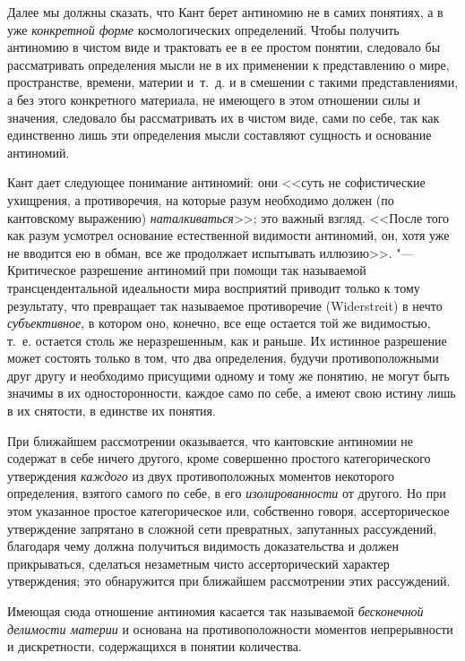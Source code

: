 Далее мы должны сказать, что Кант берет антиномию не в самих понятиях, а в
уже {\em конкретной форме} космологических определений.
Чтобы получить антиномию в чистом виде и трактовать ее в ее простом
понятии, следовало бы рассматривать определения мысли не в их применении к
представлению о мире, пространстве, времени, материи и~т.~д. и в смешении с
такими представлениями, а без этого конкретного материала, не имеющего в
этом отношении силы и значения, следовало бы рассматривать их в чистом
виде, сами по себе, так как единственно лишь эти определения мысли
составляют сущность и основание антиномий.

Кант дает следующее понимание антиномий: они <<суть не софистические
ухищрения, а противоречия, на которые разум необходимо должен (по
кантовскому выражению) {\em наталкиваться}>>; это важный
взгляд. <<После того как разум усмотрел основание естественной видимости
антиномий, он, хотя уже не вводится ею в обман, все же продолжает
испытывать иллюзию>>. "--- Критическое разрешение
антиномий при помощи так называемой трансцендентальной идеальности мира
восприятий приводит только к тому результату, что превращает так называемое
противоречие (Widerstreit) в нечто {\em субъективное},
в котором оно, конечно, все еще остается той же видимостью, т.~е. остается
столь же неразрешенным, как и раньше. Их истинное разрешение может состоять
только в том, что два определения, будучи противоположными друг другу и
необходимо присущими одному и тому же понятию, не могут быть значимы в их
односторонности, каждое само по себе, а имеют свою истину лишь в их
снятости, в единстве их понятия.

При ближайшем рассмотрении оказывается, что кантовские антиномии не содержат
в себе ничего другого, кроме совершенно простого категорического
утверждения {\em каждого} из двух противоположных
моментов некоторого определения, взятого самого по себе, в его
{\em изолированности} от другого. Но при этом указанное
простое категорическое или, собственно говоря, ассерторическое утверждение
запрятано в сложной сети превратных, запутанных рассуждений, благодаря чему
должна получиться видимость доказательства и должен прикрываться, сделаться
незаметным чисто ассерторический характер утверждения; это обнаружится при
ближайшем рассмотрении этих рассуждений.

Имеющая сюда отношение антиномия касается так называемой
{\em бесконечной делимости материи} и основана на
противоположности моментов непрерывности и дискретности, содержащихся в
понятии количества.

